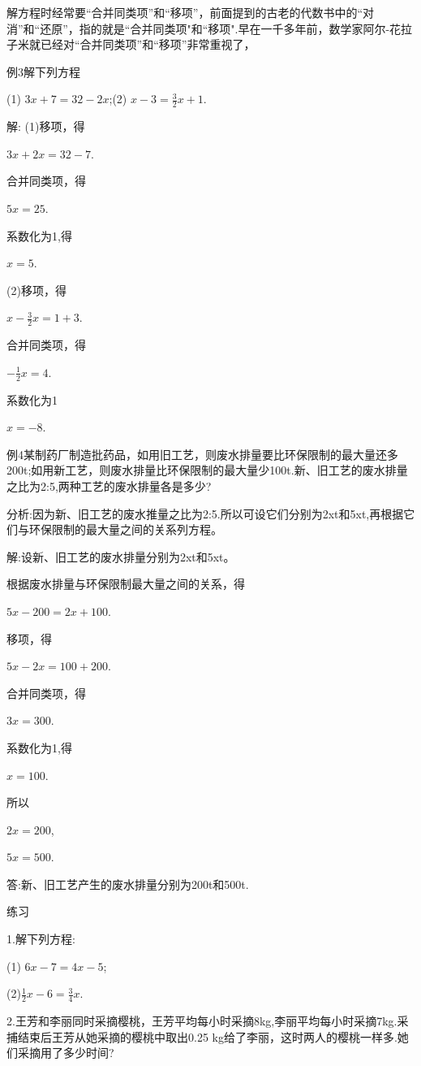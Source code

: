 \documentclass{article}
\begin{document}
\begin{article}
    解方程时经常要“合并同类项”和“移项”，前面提到的古老的代数书中的“对消”和“还原”，指的就是“合并同类项"和“移项".早在一千多年前，数学家阿尔-花拉子米就已经对“合并同类项”和“移项”非常重视了，
    \begin{example}
    
    例3解下列方程
    
    (1) $3x+7=32-2x$;(2) $x-3= \frac{3}{2}x+1$.
    
    解: (1)移项，得
    
    $3x+2x=32- 7$.
    
    合并同类项，得
    
    $5x=25$.
    
    系数化为1,得
    
    $x=5$.
    
    (2)移项，得
    
    $x-\frac{3}{2}x=1+3$.
    
    合并同类项，得
    
    $-\frac{1}{2}x=4$.
    
    系数化为1
    
    $x=-8$.
    
    例4某制药厂制造批药品，如用旧工艺，则废水排量要比环保限制的最大量还多200t;如用新工艺，则废水排量比环保限制的最大量少100t.新、旧工艺的废水排量之比为2:5,两种工艺的废水排量各是多少?
    
    分析:因为新、旧工艺的废水推量之比为2:5.所以可设它们分别为2xt和5xt,再根据它们与环保限制的最大量之间的关系列方程。
    
    解:设新、旧工艺的废水排量分别为2xt和5xt。
    
    根据废水排量与环保限制最大量之间的关系，得
    
    $5x-200=2x+100$.
    
    移项，得
    
    $5x-2x=100+200$.
    
    合并同类项，得
    
    $3x=300$.
    
    系数化为1,得
    
    $x=100$.
    
    所以
    
    $2x=200$,
    
    $5x=500$.
    
    答:新、旧工艺产生的废水排量分别为200t和500t.
    \end{example}
    \begin{exercise}
   
   练习
   
    1.解下列方程:
    
    (1) $6x-7=4x-5$;
    
    (2)$\frac{1}{2}x-6=\frac{3}{4}x$.
    
    2.王芳和李丽同时采摘樱桃，王芳平均每小时采摘8kg,李丽平均每小时采摘7kg.采捕结束后王芳从她采摘的樱桃中取出0.25 kg给了李丽，这时两人的樱桃一样多.她们采摘用了多少时间?
    \end{exercise}
\end{article}
\end{document}
